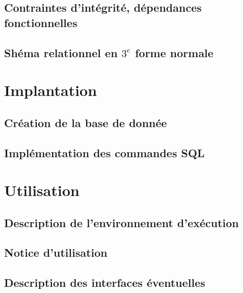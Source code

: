 \documentclass{article}
\begin{document}
\subsection{Contraintes d'intégrité, dépendances fonctionnelles}
\subsection{Shéma relationnel en $3^e$ forme normale}

\section{Implantation}
\subsection{Création de la base de donnée}
\subsection{Implémentation des commandes SQL}

\section{Utilisation}
\subsection{Description de l'environnement d'exécution}
\subsection{Notice d'utilisation}
\subsection{Description des interfaces éventuelles}
\end{document}

